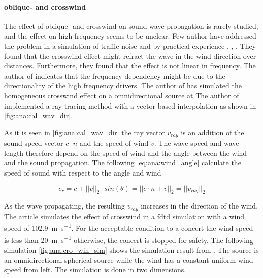 \paragraph{oblique- and crosswind} The effect of oblique- and crosswind on sound wave propagation is rarely studied, and the effect on high frequency seems to be unclear. Few author have addressed the problem in a simulation of traffic noise and by practical experience \citep{effect_of_wind}, \citep{crosswind_effect_2016}, \citep{BALLOU2008xi}. They found that the crosswind effect might refract the wave in the wind direction over distances. Furthermore, they found that the effect is not linear in frequency. The author of \citep{BALLOU2008xi} indicates that the frequency dependency might be due to the directionality of the high frequency drivers. The author of \citep{crosswind_simulation} has simulated the homogeneous crosswind effect on a omnidirectional source at  The author of \citep{ray_tracing} implemented a ray tracing method with a vector based interpolation as shown in \autoref{fig:ana:cal_wav_dir}.



\startexplain
{}
\stopexplain

As it is seen in \autoref{fig:ana:cal_wav_dir} the ray vector $v_{ray}$ is an addition of the sound speed vector $c \cdot n$ and the speed of wind $v$. The wave speed and wave length therefore depend on the speed of wind and the angle between the wind and the sound propagation. The following \autoref{eq:ana:wind_angle} calculate the speed of sound with respect to the angle and wind 


\begin{equation}\label{eq:ana:wind_angle}
c_r = c+||v||_2 \cdot sin(\theta) = ||c \cdot n + v||_2 = ||v_{ray}||_2
\end{equation}

\startexplain
{}
\stopexplain



As the wave propagating, the resulting $v_{ray}$ increases in the direction of the wind. The article \citep{crosswind_simulation} simulates the effect of crosswind in a \gls{fdtd} simulation with a wind speed of \SI{102.9}{\meter\per\second}. For the acceptable condition to a concert the wind speed is less than \SI{20}{\meter\per\second} otherwise, the concert is stopped for safety. The following simulation \autoref{fig:ana:cro_win_sim} shows the simulation result from \citep{crosswind_simulation}. The source is an omnidirectional  spherical source while the wind has a constant uniform wind speed from left. The simulation is done in two dimensions. 


